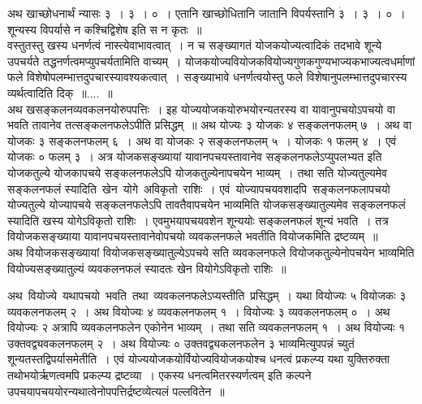 \documentclass[11pt, openany]{book}
\begin{document}
 अथ खाच्छोधनार्थं न्यासः ३~। ३~। ०~। एतानि खाच्छोधितानि 
जातानि विपर्यस्तानि $\dot{\text{३}}$~। ३~। ०~। शून्यस्य विपर्यासे न कश्चिद्विशेष इति स न कृतः~॥ \\

\vspace{-3mm}
 वस्तुतस्तु खस्य धनर्णत्वं नास्त्येवाभावत्वात्~। न च सङ्ख्यागतं 
योजकयोज्यत्वादिकं तदभावे शून्ये उपचर्यते तद्धनर्णत्वमप्युपचर्यतामिति 
वाच्यम्~। योजकयोज्यवियोजकवियोज्यगुणकगुण्यभाज्यकभाज्यत्वधर्माणां फले 
विशेषोपलम्भात्तदुपचारस्यावश्यकत्वात्~। सङ्ख्याभावे धनर्णत्वयोस्तु फले 
विशेषानुपलम्भात्तदुपचारस्य व्यर्थत्वादिति दिक्~॥....~॥ \\

\vspace{-3mm}
 अथ \;खसङ्कलनव्यवकलनयोरुपपत्तिः~। इह \;योज्ययोजकयोरुभयोरन्यतरस्य \;वा यावानुपचयोऽपचयो वा भवति तावानेव तत्सङ्कलनफलेऽपीति प्रसिद्धम्~॥
अथ योज्यः ३ योजकः ४ सङ्कलनफलम् ७~। अथ वा योजकः ३ सङ्कलनफलम् ६~। अथ वा योजकः २ सङ्कलनफलम् ५~। योजकः १ फलम् ४~। एवं योजकः ० फलम् ३~। अत्र योजकसङ्ख्यायां यावानपचयस्तावानेव सङ्कलनफलेऽप्युपलभ्यत 
इति योजकतुल्ये योजकापचये सङ्कलनफलेऽपि योजकतुल्येनापचयेन भाव्यम्~। 
तथा सति योज्यतुल्यमेव सङ्कलनफलं स्यादिति \,खेन \,योगे \,अविकृतो \,राशिः~। एवं \,योज्यापचयवशादपि \,सङ्कलनफलापचयो योज्यतुल्ये योज्यापचये 
सङ्कलनफलेऽपि तावतैवापचयेन भाव्यमिति योजकसङ्ख्यातुल्यमेव सङ्कलनफलं 
स्यादिति खस्य योगेऽविकृतो राशिः~। एवमुभयापचयवशेन शून्ययोः 
सङ्कलनफलं शून्यं भवति~। तत्र वियोजकसङ्ख्याया यावानपचयस्तावानेवोपचयो 
व्यवकलनफले भवतीति वियोजकमिति द्रष्टव्यम्~॥ \\

\vspace{-3mm}
 अथ वियोजकसङ्ख्यायां वियोजकसङ्ख्यातुल्येऽपचये सति व्यवकलनफले वियोजकतुल्येनोपचयेन भाव्यमिति वियोज्यसङ्ख्यातुल्यं व्यवकलनफलं 
स्यादतः खेन वियोगेऽविकृतो राशिः~॥

\newpage

 अथ \,वियोज्ये \,यथापचयो \,भवति \,तथा \,व्यवकलनफलेऽप्यस्तीति \,प्रसिद्धम्~। यथा वियोज्यः ५ वियोजकः ३ व्यवकलनफलम् २~। अथ वियोज्यः ४ व्यवकलनफलम् १~। वियोज्यः ३ व्यवकलनफलम् ०~। अथ वियोज्यः २ अत्रापि व्यवकलनफलेन एकोनेन भाव्यम्~। तथा सति व्यवकलनफलम् १~। अथ वियोज्यः १ उक्तवद्व्यवकलनफलम् $\dot{\text{२}}$~। अथ वियोज्यः ० उक्तवद्व्यकलनफलेन $\dot{\text{३}}$ भाव्यमित्युपपन्नं च्युतं शून्यतस्तद्विपर्यासमेतीति~। एवं योज्ययोजकयोर्वियोज्यवियोजकयोश्च धनत्वं प्रकल्प्य यथा युक्तिरुक्ता तथोभयोर्ऋणत्वमपि प्रकल्प्य द्रष्टव्या~। एकस्य धनत्वमितरस्यर्णत्वम् इति कल्पने उपचयापचययोरन्यथात्वेनोपपत्तिर्द्रष्टव्येत्यलं पल्लवितेन~॥\\
\end{document}
